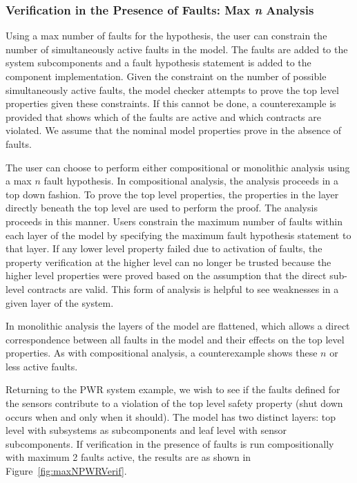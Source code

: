 \subsubsection{Verification in the Presence of Faults: Max \textit{n} Analysis}
Using a max number of faults for the hypothesis, the user can constrain the number of simultaneously active faults in the model. The faults are added to the system subcomponents and a fault hypothesis statement is added to the component implementation. Given the constraint on the number of possible simultaneously active faults, the model checker attempts to prove the top level properties given these constraints. If this cannot be done, a counterexample is provided that shows which of the faults are active and which contracts are violated. We assume that the nominal model properties prove in the absence of faults.

The user can choose to perform either compositional or monolithic analysis using a max $n$ fault hypothesis. In compositional analysis, the analysis proceeds in a top down fashion. To prove the top level properties, the properties in the layer directly beneath the top level are used to perform the proof. The analysis proceeds in this manner. Users constrain the maximum number of faults within each layer of the model by specifying the maximum fault hypothesis statement to that layer. If any lower level property failed due to activation of faults, the property verification at the higher level can no longer be trusted because the higher level properties were proved based on the assumption that the direct sub-level contracts are valid. This form of analysis is helpful to see weaknesses in a given layer of the system. 

In monolithic analysis the layers of the model are flattened, which allows a direct correspondence between all faults in the model and their effects on the top level properties. As with compositional analysis, a counterexample shows these $n$ or less active faults. 

Returning to the PWR system example, we wish to see if the faults defined for the sensors contribute to a violation of the top level safety property (shut down occurs when and only when it should). The model has two distinct layers: top level with subsystems as subcomponents and leaf level with sensor subcomponents. If verification in the presence of faults is run compositionally with maximum 2 faults active, the results are as shown in Figure~\ref{fig:maxNPWRVerif}. 


